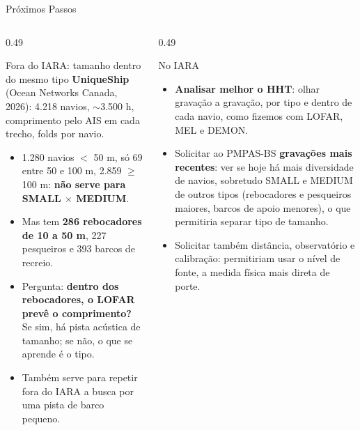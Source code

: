 \documentclass[aspectratio=169]{beamer}
\begin{document}
\begin{frame}{Próximos Passos}
    \footnotesize
    \begin{columns}[T]
        \begin{column}{0.49\textwidth}
            \begin{block}{\small Fora do IARA: tamanho dentro do mesmo tipo}
                \scriptsize
                \textbf{UniqueShip} (Ocean Networks Canada, 2026): 4.218 navios, $\sim$3.500 h, comprimento pelo AIS em cada trecho, folds por navio.
                \begin{itemize}
                    \setlength{\itemsep}{1pt}
                    \item 1.280 navios $<$ 50 m, só 69 entre 50 e 100 m, 2.859 $\geq$ 100 m: \textbf{não serve para SMALL $\times$ MEDIUM}.
                    \item Mas tem \textbf{286 rebocadores de 10 a 50 m}, 227 pesqueiros e 393 barcos de recreio.
                    \item Pergunta: \textbf{dentro dos rebocadores, o LOFAR prevê o comprimento?} Se sim, há pista acústica de tamanho; se não, o que se aprende é o tipo.
                    \item Também serve para repetir fora do IARA a busca por uma pista de barco pequeno.
                \end{itemize}
            \end{block}
        \end{column}
        \begin{column}{0.49\textwidth}
            \begin{block}{\small No IARA}
                \scriptsize
                \begin{itemize}
                    \setlength{\itemsep}{1pt}
                    \item \textbf{Analisar melhor o HHT}: olhar gravação a gravação, por tipo e dentro de cada navio, como fizemos com LOFAR, MEL e DEMON.
                    \item Solicitar ao PMPAS-BS \textbf{gravações mais recentes}: ver se hoje há mais diversidade de navios, sobretudo SMALL e MEDIUM de outros tipos (rebocadores e pesqueiros maiores, barcos de apoio menores), o que permitiria separar tipo de tamanho.
                    \item Solicitar também distância, observatório e calibração: permitiriam usar o nível de fonte, a medida física mais direta de porte.
                \end{itemize}
            \end{block}
        \end{column}
    \end{columns}
\end{frame}
\end{document}
